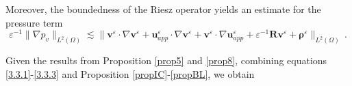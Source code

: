 \documentclass[pdflatex,sn-mathphys-num]{sn-jnl}%
\theoremstyle{thmstyleone}%
\theoremstyle{thmstyletwo}%
\theoremstyle{thmstylethree}%
\theoremstyle{thmstyletwo}
\begin{document}
Moreover, the boundedness of the Riesz operator yields an estimate for the pressure term
\begin{equation}\label{3.3.3}
	{\varepsilon}^{-1}\lVert
	\nabla p_v
	\rVert_{{L}^{2}(\Omega)}
	\lesssim
	\lVert
	{\boldsymbol v}^{\varepsilon} \cdot \nabla {\boldsymbol v}^{\varepsilon}
	+
	{\boldsymbol u}_{app}^{\varepsilon} \cdot \nabla {\boldsymbol v}^{\varepsilon}
	+
	{\boldsymbol v}^{\varepsilon} \cdot \nabla\boldsymbol{u}^\varepsilon_{app}
	+
	{\varepsilon}^{-1}\boldsymbol{R}\boldsymbol v^{\varepsilon}
	+\boldsymbol \rho^{\varepsilon}
	\rVert_{{L}^{2}(\Omega)}\,.
\end{equation}



Given the results from Proposition \ref{prop5} and \ref{prop8}, combining equations \eqref{3.3.1}-\eqref{3.3.3} and Proposition \ref{propIC}-\ref{propBL}, we obtain
\end{document}
